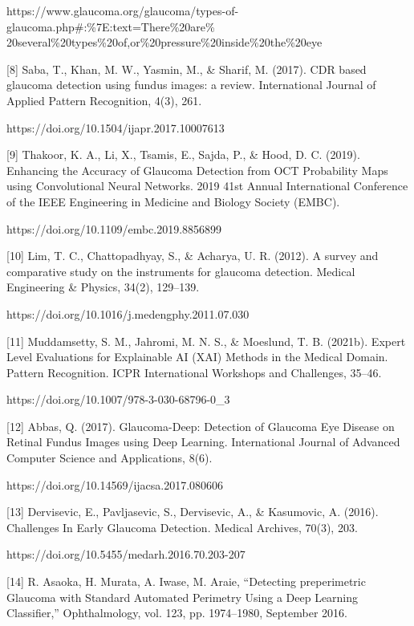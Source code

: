 https://www.glaucoma.org/glaucoma/types-of-glaucoma.php#:\%7E:text=There\%20are\% 20several\%20types\%20of,or\%20pressure\%20inside\%20the\%20eye

\vspace{5mm}
[8] Saba, T., Khan, M. W., Yasmin, M., & Sharif, M. (2017). CDR based glaucoma detection using fundus images: a review. International Journal of Applied Pattern Recognition, 4(3), 261. 

https://doi.org/10.1504/ijapr.2017.10007613

\vspace{5mm}
[9] Thakoor, K. A., Li, X., Tsamis, E., Sajda, P., & Hood, D. C. (2019). Enhancing the Accuracy of Glaucoma Detection from OCT Probability Maps using Convolutional Neural Networks. 2019 41st Annual International Conference of the IEEE Engineering in Medicine and Biology Society (EMBC). 

https://doi.org/10.1109/embc.2019.8856899

\vspace{5mm}
[10]  Lim, T. C., Chattopadhyay, S., & Acharya, U. R. (2012). A survey and comparative study on the instruments for glaucoma detection. Medical Engineering & Physics, 34(2), 129–139. 

https://doi.org/10.1016/j.medengphy.2011.07.030

\vspace{5mm}
[11] Muddamsetty, S. M., Jahromi, M. N. S., & Moeslund, T. B. (2021b). Expert Level Evaluations for Explainable AI (XAI) Methods in the Medical Domain. Pattern Recognition. ICPR International Workshops and Challenges, 35–46. 

https://doi.org/10.1007/978-3-030-68796-0_3

\vspace{5mm}
[12] Abbas, Q. (2017). Glaucoma-Deep: Detection of Glaucoma Eye Disease on Retinal Fundus Images using Deep Learning. International Journal of Advanced Computer Science and Applications, 8(6). 

https://doi.org/10.14569/ijacsa.2017.080606

\vspace{5mm}
[13]  Dervisevic, E., Pavljasevic, S., Dervisevic, A., & Kasumovic, A. (2016). Challenges In Early Glaucoma Detection. Medical Archives, 70(3), 203. 

https://doi.org/10.5455/medarh.2016.70.203-207

\vspace{5mm}
[14]  R. Asaoka, H. Murata, A. Iwase, M. Araie, “Detecting preperimetric Glaucoma with Standard Automated Perimetry Using a Deep Learning Classifier,” Ophthalmology, vol. 123, pp. 1974–1980, September 2016.

